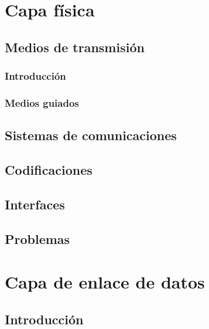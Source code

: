 \documentclass[
]{book}
\begin{document}
\hypertarget{capa-fuxedsica}{%
\chapter{Capa física}\label{capa-fuxedsica}}

\hypertarget{medios-de-transmisiuxf3n}{%
\section{Medios de transmisión}\label{medios-de-transmisiuxf3n}}

\hypertarget{introducciuxf3n}{%
\subsection{Introducción}\label{introducciuxf3n}}

\hypertarget{medios-guiados}{%
\subsection{Medios guiados}\label{medios-guiados}}

\hypertarget{sistemas-de-comunicaciones-1}{%
\section{Sistemas de comunicaciones}\label{sistemas-de-comunicaciones-1}}

\hypertarget{codificaciones}{%
\section{Codificaciones}\label{codificaciones}}

\hypertarget{interfaces}{%
\section{Interfaces}\label{interfaces}}

\hypertarget{problemas-1}{%
\section{Problemas}\label{problemas-1}}

\hypertarget{capa-de-enlace-de-datos}{%
\chapter{Capa de enlace de datos}\label{capa-de-enlace-de-datos}}

\hypertarget{introducciuxf3n-1}{%
\section{Introducción}\label{introducciuxf3n-1}}
\end{document}
